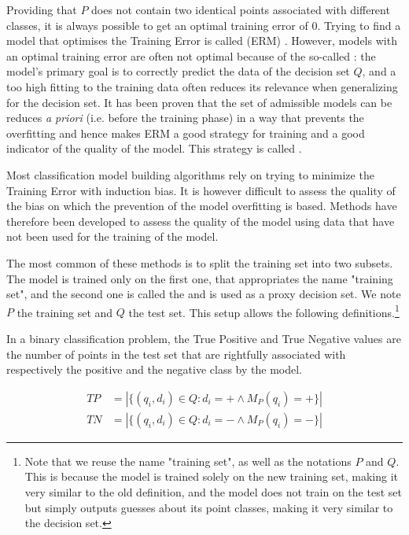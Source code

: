 Providing that $P$ does not contain two identical points associated with different classes, it is always possible to get an optimal training error of $0$. Trying to find a model that optimises the Training Error is called  (ERM) \cite{shalev-shwartz2014_UnderstandingMachineLearning}. However, models with an optimal training error are often not optimal because of the so-called : the model's primary goal is to correctly predict the data of the decision set $Q$, and a too high fitting to the training data often reduces its relevance when generalizing for the decision set. It has been proven that the set of admissible models can be reduces \textit{a priori} (i.e. before the training phase) in a way that prevents the overfitting and hence makes ERM a good strategy for training and a good indicator of the quality of the model. This strategy is called  \cite{shalev-shwartz2014_UnderstandingMachineLearning}.

Most classification model building algorithms rely on trying to minimize the Training Error with induction bias. It is however difficult to assess the quality of the bias on which the prevention of the model overfitting is based. Methods have therefore been developed to assess the quality of the model using data that have not been used for the training of the model.

The most common of these methods is to split the training set into two subsets. The model is trained only on the first one, that appropriates the name "training set", and the second one is called the  and is used as a proxy decision set. We note $P$ the training set and $Q$ the test set. This setup allows the following definitions.\footnote{Note that we reuse the name "training set", as well as the notations $P$ and $Q$. This is because the model is trained solely on the new training set, making it very similar to the old definition, and the model does not train on the test set but simply outputs guesses about its point classes, making it very similar to the decision set.}

\begin{definition}
In a binary classification problem, the True Positive and True Negative values are the number of points in the test set that are rightfully associated with respectively the positive and the negative class by the model.

\begin{equation}
    \begin{array}{ll}
         TP & = |\{(q_i, d_i)\in Q: d_i = + \land M_P(q_i) = +\}| \\
         TN & = |\{(q_i, d_i)\in Q: d_i = - \land M_P(q_i) = -\}|
    \end{array}
\end{equation}
\end{definition}


